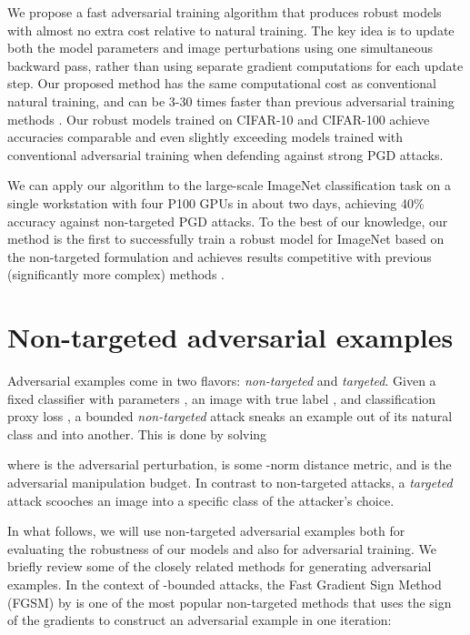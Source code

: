 \documentclass{article}
\begin{document}
We propose a fast adversarial training algorithm that produces robust models with almost no extra cost relative to natural training. The key idea is to update both the model parameters and image perturbations using one simultaneous backward pass, rather than using separate gradient computations for each update step. 
Our proposed method has the same computational cost as conventional natural training, and can be 3-30 times faster than previous adversarial training methods \citep{madry2017towards,xie2018feature}. 
Our robust models trained on CIFAR-10 and CIFAR-100 achieve accuracies comparable and even slightly exceeding models trained with conventional adversarial training when defending against strong PGD attacks. 

We can apply our algorithm to the large-scale ImageNet classification task on a single workstation with four P100 GPUs in about two days, achieving 40\% accuracy against non-targeted PGD attacks. To the best of our knowledge, our method is the first to successfully train a robust model for ImageNet based on the non-targeted formulation and achieves results competitive with previous (significantly more complex) methods \citep{kannan2018adversarial,xie2018feature}. 

\section{Non-targeted adversarial examples}\label{sec:adv_generation}

 Adversarial examples come in two flavors: \emph{non-targeted} and \emph{targeted}. Given a fixed classifier with parameters , an image  with true label , and classification proxy loss , a bounded {\em non-targeted} attack sneaks an example out of its natural class and into another. This is done by solving

where  is the adversarial perturbation,  is some -norm distance metric, and  is the adversarial manipulation budget. 
In contrast to non-targeted attacks, a {\em targeted} attack scooches an image into a specific class of the attacker's choice. 


In what follows, we will use non-targeted adversarial examples both for evaluating the robustness of our models and also for adversarial training. We briefly review some of the closely related methods for generating adversarial examples. In the context of -bounded attacks, the Fast Gradient Sign Method (FGSM) by \cite{goodfellow2014explaining} is one of the most popular non-targeted methods that uses the sign of the gradients to construct an adversarial example in one iteration:
\end{document}
